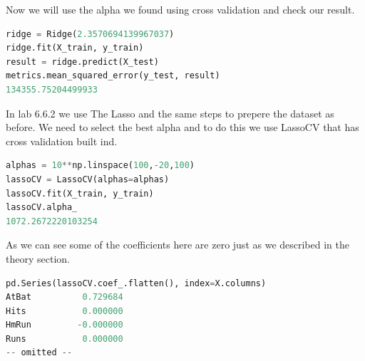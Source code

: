 Now we will use the alpha we found using  cross validation and check our result.
\begin{lstlisting}[language=Python]
ridge = Ridge(2.3570694139967037)
ridge.fit(X_train, y_train)
result = ridge.predict(X_test)
metrics.mean_squared_error(y_test, result)
134355.75204499933
\end{lstlisting}
In lab 6.6.2 we use The Lasso and the same steps to prepere the dataset as before. We need to select the best alpha and to do this we use LassoCV that has cross validation built ind.
\begin{lstlisting}[language=Python]
alphas = 10**np.linspace(100,-20,100)
lassoCV = LassoCV(alphas=alphas)
lassoCV.fit(X_train, y_train)
lassoCV.alpha_
1072.2672220103254
\end{lstlisting}
As we can see some of the coefficients here are zero just as we described in the theory section.
\begin{lstlisting}[language=Python]
pd.Series(lassoCV.coef_.flatten(), index=X.columns)
AtBat          0.729684
Hits           0.000000
HmRun         -0.000000
Runs           0.000000
-- omitted --
\end{lstlisting}






